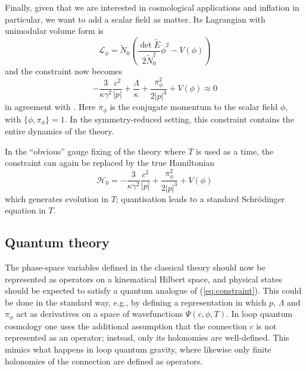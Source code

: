 \documentclass[aps,prd,11pt,showkeys,nofootinbib]{revtex4-2}
\begin{document}
Finally, given that we are interested in cosmological applications and inflation in particular, we want to add a scalar field as matter. Its Lagrangian with unimodular volume form is
\begin{equation}
  \mathcal{L}_\phi = \tilde{N}_0\left(\frac{\det\tilde{E}}{2\tilde{N}_0^2}\dot\phi^2-V(\phi)\right)
\end{equation}
and the constraint now becomes
\begin{equation}
   -\frac{3}{\kappa\gamma^2}\frac{c^2}{|p|} + \frac{\Lambda}{\kappa} +\frac{\pi_\phi^2}{2|p|^3}+V(\phi)\approx 0
   \label{eq:constraint}
\end{equation}
in agreement with \cite{Chiou:2010ne}. Here $\pi_\phi$ is the conjugate momentum to the scalar field $\phi$, with $\{\phi,\pi_\phi\}=1$. In the symmetry-reduced setting, this constraint contains the entire dynamics of the theory. 

In the ``obvious'' gauge fixing of the theory where $T$ is used as a time, the constraint can again be replaced by the true Hamiltonian
\begin{equation}
\mathcal{H}_0 =  -\frac{3}{\kappa\gamma^2}\frac{c^2}{|p|}  +\frac{\pi_\phi^2}{2|p|^3}+V(\phi)
\end{equation}
which generates evolution in $T$; quantisation leads to a standard Schr\"odinger equation in $T$. 


\subsection{Quantum theory}

The phase-space variables defined in the classical theory should now be represented as operators on a kinematical Hilbert space, and physical states should be expected to satisfy a quantum analogue of (\ref{eq:constraint}). This could be done in the standard way, e.g., by defining a representation in which $p$, $\Lambda$ and $\pi_\phi$ act as derivatives on a space of wavefunctions $\Psi(c,\phi,T)$. In loop quantum cosmology one uses the additional assumption that the connection $c$ is not represented as an operator; instead, only its holonomies are well-defined. This mimics what happens in loop quantum gravity, where likewise only finite holonomies of the connection are defined as operators.
\end{document}
